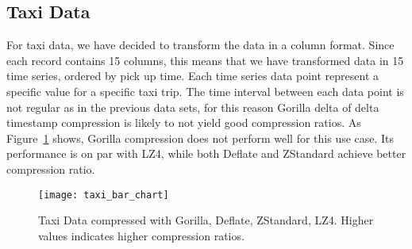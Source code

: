 \subsection{Taxi Data}
For taxi data, we have decided to transform the data in a column format.
Since each record contains 15 columns, this means that we have transformed data in 15 time series,
ordered by pick up time.
Each time series data point represent a specific value for a specific taxi trip.
The time interval between each data point is not regular as in the previous data sets, for this
reason Gorilla delta of delta timestamp compression is likely to not yield good compression
ratios.
As Figure~\ref{taxi_bar_chart} shows, Gorilla compression does not perform well for this use case.
Its performance is on par with LZ4, while both Deflate and ZStandard achieve better compression ratio.

\begin{figure}[!htbp]
\begin{center}
\texttt{[image: taxi\_bar\_chart]}
\caption[compression]{Taxi Data compressed with Gorilla, Deflate, ZStandard, LZ4.
Higher values indicates higher compression ratios.}
\label{taxi_bar_chart}
\end{center}
\end{figure}